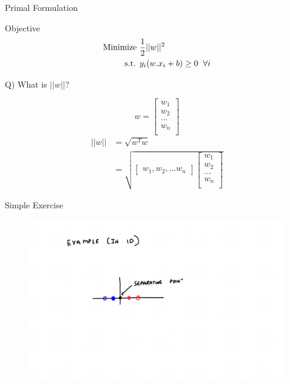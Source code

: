 \documentclass{beamer}
\begin{document}
\begin{frame}{Primal Formulation}
	\begin{tcolorbox}{Objective}
	\begin{align*}
	\text{Minimize } & \frac{1}{2}||w||^{2} \\
	\text{s.t. } & y_{i}(w.x_{i} + b) \geq 0 \hspace{2mm}\forall i
	\end{align*}
\end{tcolorbox}
\pause 
Q) What is $||w||$?
\pause
\begin{multicols}{2}
\begin{equation*}
	 w = \begin{bmatrix}
	 w_{1} \\
     w_{2} \\
     ...  \\
     w_{n} \\
	\end{bmatrix}
\end{equation*}\break
\begin{align*}
	 ||w|| &= \sqrt{w^{T}w}\\
	 &= \sqrt{\begin{bmatrix}
	 w_{1}, w_{2}, ... w_{n}
	 \end{bmatrix}
	 \begin{bmatrix}
	  w_{1} \\
	  w_{2} \\
     ...  \\
     w_{n} \\
	 \end{bmatrix}}
\end{align*}

\end{multicols}

\end{frame}

\begin{frame}{Simple Exercise}

\begin{figure}
\includegraphics[scale = 0.5]{SVM/Svm-21.pdf}
\end{figure} 

\end{frame}
\end{document}
